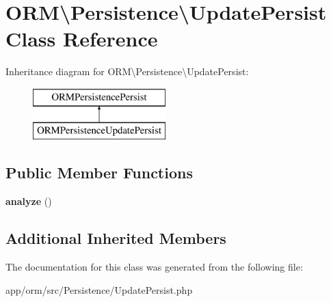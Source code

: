 \hypertarget{classORM_1_1Persistence_1_1UpdatePersist}{}\section{O\+RM\textbackslash{}Persistence\textbackslash{}Update\+Persist Class Reference}
\label{classORM_1_1Persistence_1_1UpdatePersist}
Inheritance diagram for O\+RM\textbackslash{}Persistence\textbackslash{}Update\+Persist\+:\begin{figure}[H]
\begin{center}
\leavevmode
\includegraphics[height=2.000000cm]{classORM_1_1Persistence_1_1UpdatePersist}
\end{center}
\end{figure}
\subsection*{Public Member Functions}
\begin{DoxyCompactItemize}
\item 
{\bfseries analyze} ()\hypertarget{classORM_1_1Persistence_1_1UpdatePersist_a4eaa1b3bc00c1ab9bf705285ee30b394}{}\label{classORM_1_1Persistence_1_1UpdatePersist_a4eaa1b3bc00c1ab9bf705285ee30b394}

\end{DoxyCompactItemize}
\subsection*{Additional Inherited Members}


The documentation for this class was generated from the following file\+:\begin{DoxyCompactItemize}
\item 
app/orm/src/\+Persistence/Update\+Persist.\+php\end{DoxyCompactItemize}
